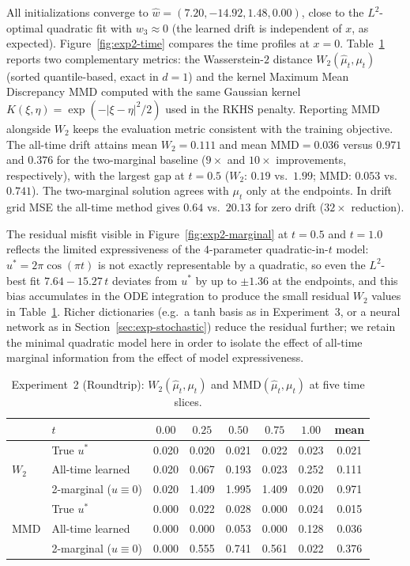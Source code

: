 \documentclass[11pt,leqno]{article}
\theoremstyle{plain}
\theoremstyle{remark}
\theoremstyle{definition}
\numberwithin{equation}{section}
\numberwithin{figure}{section}
\numberwithin{table}{section}
\begin{document}
All initializations converge to
$\hat w=(7.20,-14.92,1.48,0.00)$, close to the $L^2$-optimal quadratic fit
with $w_3\approx 0$ (the learned drift is independent of $x$, as expected).
Figure~\ref{fig:exp2-time} compares the time profiles at $x=0$.
Table~\ref{tab:exp2-w2mmd} reports two complementary metrics: the
Wasserstein-$2$ distance $W_2(\hat\mu_t,\mu_t)$ (sorted quantile-based,
exact in $d=1$) and the kernel Maximum Mean Discrepancy $\mathrm{MMD}$
computed with the same Gaussian kernel $K(\xi,\eta)=\exp(-|\xi-\eta|^2/2)$ used
in the RKHS penalty.  Reporting MMD alongside $W_2$ keeps the
evaluation metric consistent with the training objective.
The all-time drift attains mean $W_2=0.111$ and mean $\mathrm{MMD}=0.036$
versus $0.971$ and $0.376$ for the two-marginal baseline
($9\times$ and $10\times$ improvements, respectively), with the largest
gap at $t=0.5$ ($W_2$: $0.19$ vs.\ $1.99$;
$\mathrm{MMD}$: $0.053$ vs.\ $0.741$).  The two-marginal solution agrees
with $\mu_t$ only at the endpoints.  In drift grid MSE the all-time
method gives $0.64$ vs.\ $20.13$ for zero drift ($32\times$ reduction).

The residual misfit visible in Figure~\ref{fig:exp2-marginal} at $t=0.5$
and $t=1.0$ reflects the limited expressiveness of the $4$-parameter
quadratic-in-$t$ model: $u^*=2\pi\cos(\pi t)$ is not exactly
representable by a quadratic, so even the $L^2$-best fit
$7.64-15.27\,t$ deviates from $u^*$ by up to $\pm1.36$ at the endpoints,
and this bias accumulates in the ODE integration to produce the small
residual $W_2$ values in Table~\ref{tab:exp2-w2mmd}.  Richer dictionaries
(e.g.\ a tanh basis as in Experiment~3, or a neural network as in
Section~\ref{sec:exp-stochastic}) reduce the residual further; we retain
the minimal quadratic model here in order to isolate the effect of
all-time marginal information from the effect of model expressiveness.

\begin{table}[htbp]
\centering
\caption{Experiment~2 (Roundtrip): $W_2(\hat\mu_t,\mu_t)$ and
$\mathrm{MMD}(\hat\mu_t,\mu_t)$ at five time slices.}
\label{tab:exp2-w2mmd}
\begin{tabular}{llccccc|c}
\toprule
& $t$ & $0.00$ & $0.25$ & $0.50$ & $0.75$ & $1.00$ & mean \\
\midrule
\multirow{3}{*}{$W_2$}
 & True $u^*$                    & 0.020 & 0.020 & 0.021 & 0.022 & 0.023 & 0.021 \\
 & All-time learned              & 0.020 & 0.067 & 0.193 & 0.023 & 0.252 & 0.111 \\
 & 2-marginal ($u{\equiv}0$)     & 0.020 & 1.409 & 1.995 & 1.409 & 0.020 & 0.971 \\
\midrule
\multirow{3}{*}{$\mathrm{MMD}$}
 & True $u^*$                    & 0.000 & 0.022 & 0.028 & 0.000 & 0.024 & 0.015 \\
 & All-time learned              & 0.000 & 0.000 & 0.053 & 0.000 & 0.128 & 0.036 \\
 & 2-marginal ($u{\equiv}0$)     & 0.000 & 0.555 & 0.741 & 0.561 & 0.022 & 0.376 \\
\bottomrule
\end{tabular}
\end{table}
\end{document}
